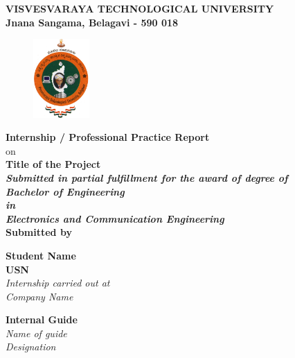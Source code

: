 
\begin{titlingpage}
\thispagestyle{empty}\centering

\setlength{\toptafiddle}{1in}
\setlength{\bottafiddle}{1in}
\vspace*{-1.25in}
\enlargethispage{\toptafiddle}
\large 
\textbf{VISVESVARAYA TECHNOLOGICAL UNIVERSITY\\
	Jnana Sangama, Belagavi - 590 018}\\
\vspace{0.2cm}
\begin{figure}[h]
\centering
\includegraphics[height=3cm]{images/vtu.png}
\end{figure}
\textbf{\color{red}Internship / Professional Practice Report}\\
{\color{red}on}\\

\Large{\textbf{\color{blue}Title of the Project}}\\
\small{\textit{\textbf{\color{red}Submitted in partial fulfillment for the award of degree of}}}\\

\vspace{0.2cm}
\textit{\textbf{\color{blue}Bachelor of Engineering\\ in \\Electronics and Communication Engineering}}
\vspace{0.5cm}\\
\textbf{Submitted by}


\begin{center}
	\Large\textbf{\color{blue}Student Name}\\
	\Large\textbf{\color{blue}USN}\\
		
	\textit{\color{red}Internship carried out at}\\
	
	\textit{\color{blue}Company Name}\\
\end{center}
\vspace{0.3cm}

\begin{minipage}[t]{0.6\textwidth}%
	\Large\textbf{Internal Guide}\\
	\large\textit{\color{blue}Name of guide}\\
	\large\textit{\color{blue}Designation}\\
	

\end{minipage}
\end{titlingpage}
